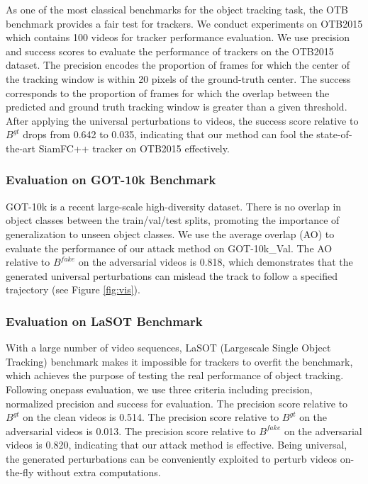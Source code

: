 \documentclass{article}
\begin{document}
As one of the most classical benchmarks for the object tracking task, the OTB benchmark provides a fair test for trackers. We conduct experiments on OTB2015 \cite{OTB} which contains 100 videos for tracker performance evaluation.
We use precision and success scores to evaluate the performance of trackers on the OTB2015 dataset.
The precision encodes the proportion of frames for which the center of the tracking window is within 20 pixels of the ground-truth center. The success corresponds to the proportion of frames for which the overlap between the predicted and ground truth tracking window is greater than a given threshold.
After applying the universal perturbations to videos, the success score relative to $B^{gt}$ drops from 0.642 to 0.035, indicating that our method can fool the state-of-the-art SiamFC++ tracker on OTB2015 effectively.

\subsubsection{Evaluation on GOT-10k Benchmark}

GOT-10k \cite{GOT-10k} is a recent large-scale high-diversity dataset. There is no overlap in object classes between the train/val/test splits, promoting the importance of generalization to unseen object classes.
We use the average overlap (AO) to evaluate the performance of our attack method on GOT-10k\_Val.
The AO relative to $B^{fake}$ on the adversarial videos is 0.818, which demonstrates that the generated universal perturbations can mislead the track to follow a specified trajectory (see Figure \ref{fig:vis}).

\subsubsection{Evaluation on LaSOT Benchmark}

With a large number of video sequences, LaSOT (Largescale Single Object Tracking) benchmark \cite{LaSOT} makes it impossible for trackers to overfit the benchmark, which achieves the purpose of testing the real performance of object tracking.
Following onepass evaluation, we use three criteria including precision, normalized precision and success for evaluation.
The precision score relative to $B^{gt}$ on the clean videos is 0.514. The precision score relative to $B^{gt}$ on the adversarial videos is 0.013. The precision score relative to $B^{fake}$ on the adversarial videos is 0.820, indicating that our attack method is effective. Being universal, the generated perturbations can be conveniently exploited to perturb videos on-the-fly without extra computations.
\end{document}
